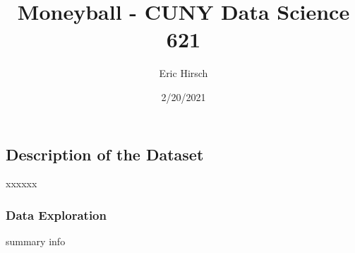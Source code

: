 \documentclass[
]{article}
\title{Moneyball - CUNY Data Science 621}
\author{Eric Hirsch}
\date{2/20/2021}
\begin{document}
\maketitle

\hypertarget{description-of-the-dataset}{%
\subsection{Description of the
Dataset}\label{description-of-the-dataset}}

xxxxxx

\hypertarget{data-exploration}{%
\subsubsection{Data Exploration}\label{data-exploration}}

summary info
\end{document}
